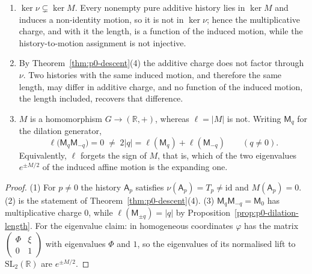 \begin{proposition}
\label{prop:p0-length-losses}
\begin{enumerate}
\item $\ker\nu\subsetneq\ker M$.  Every nonempty pure additive history lies in
  $\ker M$ and induces a non-identity motion, so it is not in $\ker\nu$; hence the
  multiplicative charge, and with it the length, is a function of the induced
  motion, while the history-to-motion assignment is not injective.
\item By Theorem~\ref{thm:p0-descent}(4) the additive charge does not factor
  through $\nu$.  Two histories with the same induced motion, and therefore the
  same length, may differ in additive charge, and no function of the induced
  motion, the length included, recovers that difference.
\item $M$ is a homomorphism $G\to(\mathbb R,+)$, whereas $\ell=\lvert M\rvert$ is
  not.  Writing $\mathsf M_q$ for the dilation generator,
  \begin{equation}\label{eq:p0-length-not-additive}
    \ell\bigl(\mathsf M_q\mathsf M_{-q}\bigr)=0
    \;\ne\;
    2\lvert q\rvert
    =\ell(\mathsf M_q)+\ell(\mathsf M_{-q})
    \qquad(q\ne0).
  \end{equation}
  Equivalently, $\ell$ forgets the sign of $M$, that is, which of the two
  eigenvalues $e^{\pm M/2}$ of the induced affine motion is the expanding one.
\end{enumerate}
\end{proposition}

\begin{proof}
(1) For $p\ne0$ the history $\mathsf A_p$ satisfies $\nu(\mathsf A_p)=T_p\ne
\mathrm{id}$ and $M(\mathsf A_p)=0$.  (2) is the statement of
Theorem~\ref{thm:p0-descent}(4).  (3) $\mathsf M_q\mathsf M_{-q}=\mathsf M_0$ has
multiplicative charge $0$, while $\ell(\mathsf M_{\pm q})=\lvert q\rvert$ by
Proposition~\ref{prop:p0-dilation-length}.  For the eigenvalue claim: in
homogeneous coordinates $\varphi$ has the matrix
$\left(\begin{smallmatrix}\Phi&\xi\\0&1\end{smallmatrix}\right)$ with eigenvalues $\Phi$ and
$1$, so the eigenvalues of its normalised lift to $\mathrm{SL}_2(\mathbb R)$ are
$e^{\pm M/2}$.
\end{proof}

